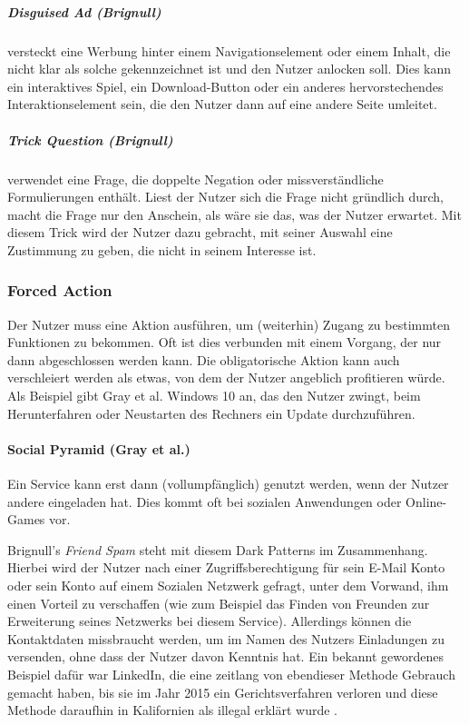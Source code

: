 \documentclass[a4paper]{article}
\begin{document}
\subparagraph{Disguised Ad (Brignull)}
versteckt eine Werbung hinter einem Navigationselement oder einem Inhalt, die nicht klar als solche gekennzeichnet ist und den Nutzer anlocken soll.
Dies kann ein interaktives Spiel, ein Download-Button oder ein anderes hervorstechendes Interaktionselement sein, die den Nutzer dann auf eine andere Seite umleitet.

\subparagraph{Trick Question (Brignull)}
verwendet eine Frage, die doppelte Negation oder missverständliche Formulierungen enthält. Liest der Nutzer sich die Frage nicht gründlich durch, macht die Frage nur den Anschein, als wäre sie das, was der Nutzer erwartet. Mit diesem Trick wird der Nutzer dazu gebracht, mit seiner Auswahl eine Zustimmung zu geben, die nicht in seinem Interesse ist. 

\subsubsection{Forced Action}
Der Nutzer muss eine Aktion ausführen, um (weiterhin) Zugang zu bestimmten Funktionen zu bekommen. Oft ist dies verbunden mit einem Vorgang, der nur dann abgeschlossen werden kann. Die obligatorische Aktion kann auch verschleiert werden als etwas, von dem der Nutzer angeblich profitieren würde. 
Als Beispiel gibt Gray et al. \cite{gray} Windows 10 an, das den Nutzer zwingt, beim Herunterfahren oder Neustarten des Rechners ein Update durchzuführen.  

\paragraph{Social Pyramid (Gray et al.)}
Ein Service kann erst dann (vollumpfänglich) genutzt werden, wenn der Nutzer andere eingeladen hat. Dies kommt oft bei sozialen Anwendungen oder Online-Games vor. 

Brignull's \textit{Friend Spam} steht mit diesem Dark Patterns im Zusammenhang. Hierbei wird der Nutzer nach einer Zugriffsberechtigung für sein E-Mail Konto oder sein Konto auf einem Sozialen Netzwerk gefragt, unter dem Vorwand, ihm einen Vorteil zu verschaffen (wie zum Beispiel das Finden von Freunden zur Erweiterung seines Netzwerks bei diesem Service). Allerdings können die Kontaktdaten missbraucht werden, um im Namen des Nutzers Einladungen zu versenden, ohne dass der Nutzer davon Kenntnis hat.
Ein bekannt gewordenes Beispiel dafür war LinkedIn, die eine zeitlang von ebendieser Methode Gebrauch gemacht haben, bis sie im Jahr 2015 ein Gerichtsverfahren verloren und diese Methode daraufhin in Kalifornien als illegal erklärt wurde \cite{brignull5}.   
\end{document}
